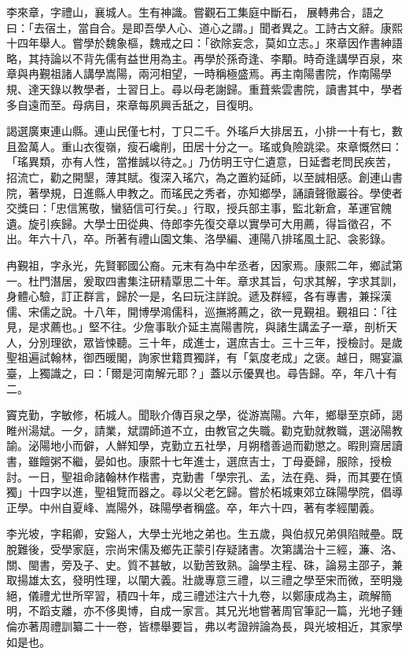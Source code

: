 \begin{pinyinscope}
李來章，字禮山，襄城人。生有神識。嘗觀石工集庭中斷石，展轉弗合，語之曰：「去宿土，當自合。是即吾學人心、道心之謂。」聞者異之。工詩古文辭。康熙十四年舉人。嘗學於魏象樞，魏戒之曰：「欲除妄念，莫如立志。」來章因作書紳語略，其持論以不背先儒有益世用為主。再學於孫奇逢、李顒。時奇逢講學百泉，來章與冉覲祖諸人講學嵩陽，兩河相望，一時稱極盛焉。再主南陽書院，作南陽學規、達天錄以教學者，士習日上。尋以母老謝歸。重葺紫雲書院，讀書其中，學者多自遠而至。母病目，來章每夙興舌舐之，目復明。

謁選廣東連山縣。連山民僅七村，丁只二千。外瑤戶大排居五，小排一十有七，數且盈萬人。重山衣復嶺，瘦石巉削，田居十分之一。瑤或負險跳梁。來章慨然曰：「瑤異類，亦有人性，當推誠以待之。」乃仿明王守仁遺意，日延耆老問民疾苦，招流亡，勸之開墾，薄其賦。復深入瑤穴，為之置約延師，以至誠相感。創連山書院，著學規，日進縣人申教之。而瑤民之秀者，亦知鄉學，誦讀聲徹巖谷。學使者交獎曰：「忠信篤敬，蠻貊信可行矣。」行取，授兵部主事，監北新倉，革運官餽遺。旋引疾歸。大學士田從典、侍郎李先復交章以實學可大用薦，得旨徵召，不出。年六十八，卒。所著有禮山園文集、洛學編、連陽八排瑤風土記、衾影錄。

冉覲祖，字永光，先賢鄆國公裔。元末有為中牟丞者，因家焉。康熙二年，鄉試第一。杜門潛居，爰取四書集注研精覃思二十年。章求其旨，句求其解，字求其訓，身體心驗，訂正群言，歸於一是，名曰玩注詳說。遞及群經，各有專書，兼採漢儒、宋儒之說。十八年，開博學鴻儒科，巡撫將薦之，欲一見覲祖。覲祖曰：「往見，是求薦也。」堅不往。少詹事耿介延主嵩陽書院，與諸生講孟子一章，剖析天人，分別理欲，眾皆悚聽。三十年，成進士，選庶吉士。三十三年，授檢討。是歲聖祖遍試翰林，御西暖閣，詢家世籍貫獨詳，有「氣度老成」之褒。越日，賜宴瀛臺，上獨識之，曰：「爾是河南解元耶？」蓋以示優異也。尋告歸。卒，年八十有二。

竇克勤，字敏修，柘城人。聞耿介傳百泉之學，從游嵩陽。六年，鄉舉至京師，謁睢州湯斌。一夕，請業，斌謂師道不立，由教官之失職。勸克勤就教職，選泌陽教諭。泌陽地小而僻，人鮮知學，克勤立五社學，月朔稽善過而勸懲之。暇則齋居讀書，雖饘粥不繼，晏如也。康熙十七年進士，選庶吉士，丁母憂歸，服除，授檢討。一日，聖祖命諸翰林作楷書，克勤書「學宗孔、孟，法在堯、舜，而其要在慎獨」十四字以進，聖祖覽而器之。尋以父老乞歸。嘗於柘城東郊立硃陽學院，倡導正學。中州自夏峰、嵩陽外，硃陽學者稱盛。卒，年六十四，著有孝經闡義。

李光坡，字耜卿，安谿人，大學士光地之弟也。生五歲，與伯叔兄弟俱陷賊壘。既脫難後，受學家庭，宗尚宋儒及鄉先正蒙引存疑諸書。次第講治十三經，濂、洛、關、閩書，旁及子、史。質不甚敏，以勤苦致熟。論學主程、硃，論易主邵子，兼取揚雄太玄，發明性理，以闡大義。壯歲專意三禮，以三禮之學至宋而微，至明幾絕，儀禮尤世所罕習，積四十年，成三禮述注六十九卷，以鄭康成為主，疏解簡明，不蹈支離，亦不侈奧博，自成一家言。其兄光地嘗著周官筆記一篇，光地子鍾倫亦著周禮訓纂二十一卷，皆標舉要旨，弗以考證辨論為長，與光坡相近，其家學如是也。


\end{pinyinscope}
